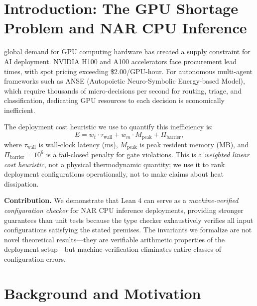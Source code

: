\documentclass[10pt,journal,compsoc]{IEEEtran}
\theoremstyle{remark}
\begin{document}
\maketitle
\IEEEdisplaynontitleabstractindextext
\IEEEpeerreviewmaketitle

\section{Introduction: The GPU Shortage Problem and NAR CPU Inference}
 global demand for GPU computing hardware has created a supply constraint for AI deployment. NVIDIA H100 and A100 accelerators face procurement lead times, with spot pricing exceeding \$2.00/GPU-hour. For autonomous multi-agent frameworks such as ANSE (Autopoietic Neuro-Symbolic Energy-based Model), which require thousands of micro-decisions per second for routing, triage, and classification, dedicating GPU resources to each decision is economically inefficient.

The deployment cost heuristic we use to quantify this inefficiency is:
\begin{equation}
E = w_t \cdot \tau_{\text{wall}} + w_m \cdot M_{\text{peak}} + \Pi_{\text{barrier}},
\label{eq:anse_energy}
\end{equation}
where $\tau_{\text{wall}}$ is wall-clock latency (ms), $M_{\text{peak}}$ is peak resident memory (MB), and $\Pi_{\text{barrier}} = 10^6$ is a fail-closed penalty for gate violations. This is a \textit{weighted linear cost heuristic}, not a physical thermodynamic quantity; we use it to rank deployment configurations operationally, not to make claims about heat dissipation.

\textbf{Contribution.} We demonstrate that Lean 4 can serve as a \emph{machine-verified configuration checker} for NAR CPU inference deployments, providing stronger guarantees than unit tests because the type checker exhaustively verifies all input configurations satisfying the stated premises. The invariants we formalize are not novel theoretical results---they are verifiable arithmetic properties of the deployment setup---but machine-verification eliminates entire classes of configuration errors.

\section{Background and Motivation}
\end{document}
